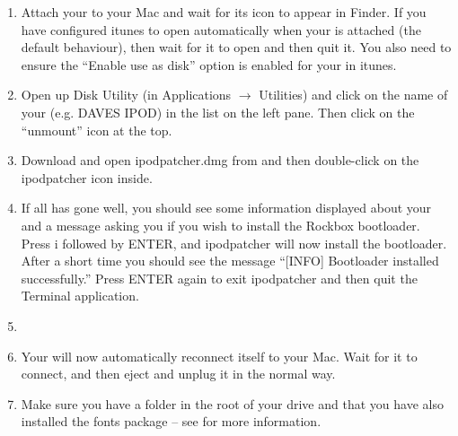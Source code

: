 \begin{enumerate}

\item Attach your \dap{} to your Mac and wait for its icon to appear in 
Finder. If you have configured itunes to open automatically when your
\dap{} is attached (the default behaviour), then wait for it to open and
then quit it. You also need to ensure the ``Enable use as disk'' option
is enabled for your \dap{} in itunes.

\item\label{subsec:macos_umount} Open up Disk Utility
(in Applications $\rightarrow$ Utilities) and click 
on the name of your \dap{} (e.g. DAVES IPOD) in the list on the left 
pane. Then click on the ``unmount'' icon at the top. 

\item Download and open ipodpatcher.dmg from 
and then double-click on the ipodpatcher icon inside. 

\item If all has gone well, you should see some 
information displayed about your \dap{} and a message asking you if you 
wish to install the Rockbox bootloader. Press i followed by ENTER, and 
ipodpatcher will now install the bootloader. After a short time you 
should see the message ``[INFO] Bootloader installed successfully.'' Press 
ENTER again to exit ipodpatcher and then quit the Terminal application.

\item {}

\item Your \dap{} will now automatically reconnect itself to your Mac. 
Wait for it to connect, and then eject and unplug it in the normal way. 

\item Make sure you have a  folder in the
root of your \daps{} drive and that you have also installed the fonts
package -- see  for more information.

\end{enumerate}

